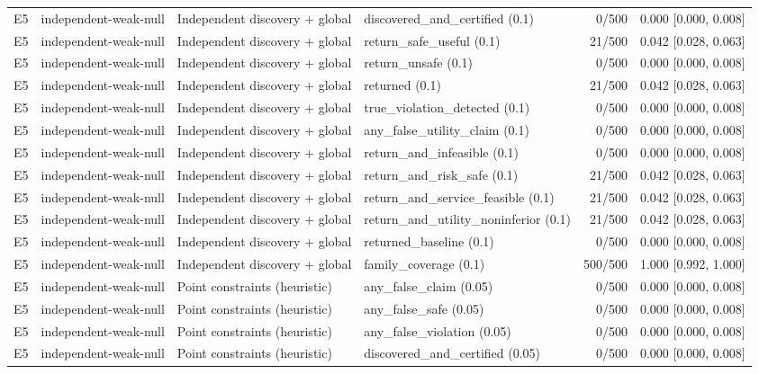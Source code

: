 \begin{longtable}{p{.04\linewidth}p{.18\linewidth}p{.19\linewidth}p{.16\linewidth}r p{.21\linewidth}}
E5 & independent-weak-null & Independent discovery + global & discovered\_and\_certified (0.1) & 0/500 & 0.000 [0.000, 0.008]\\
E5 & independent-weak-null & Independent discovery + global & return\_safe\_useful (0.1) & 21/500 & 0.042 [0.028, 0.063]\\
E5 & independent-weak-null & Independent discovery + global & return\_unsafe (0.1) & 0/500 & 0.000 [0.000, 0.008]\\
E5 & independent-weak-null & Independent discovery + global & returned (0.1) & 21/500 & 0.042 [0.028, 0.063]\\
E5 & independent-weak-null & Independent discovery + global & true\_violation\_detected (0.1) & 0/500 & 0.000 [0.000, 0.008]\\
E5 & independent-weak-null & Independent discovery + global & any\_false\_utility\_claim (0.1) & 0/500 & 0.000 [0.000, 0.008]\\
E5 & independent-weak-null & Independent discovery + global & return\_and\_infeasible (0.1) & 0/500 & 0.000 [0.000, 0.008]\\
E5 & independent-weak-null & Independent discovery + global & return\_and\_risk\_safe (0.1) & 21/500 & 0.042 [0.028, 0.063]\\
E5 & independent-weak-null & Independent discovery + global & return\_and\_service\_feasible (0.1) & 21/500 & 0.042 [0.028, 0.063]\\
E5 & independent-weak-null & Independent discovery + global & return\_and\_utility\_noninferior (0.1) & 21/500 & 0.042 [0.028, 0.063]\\
E5 & independent-weak-null & Independent discovery + global & returned\_baseline (0.1) & 0/500 & 0.000 [0.000, 0.008]\\
E5 & independent-weak-null & Independent discovery + global & family\_coverage (0.1) & 500/500 & 1.000 [0.992, 1.000]\\
E5 & independent-weak-null & Point constraints (heuristic) & any\_false\_claim (0.05) & 0/500 & 0.000 [0.000, 0.008]\\
E5 & independent-weak-null & Point constraints (heuristic) & any\_false\_safe (0.05) & 0/500 & 0.000 [0.000, 0.008]\\
E5 & independent-weak-null & Point constraints (heuristic) & any\_false\_violation (0.05) & 0/500 & 0.000 [0.000, 0.008]\\
E5 & independent-weak-null & Point constraints (heuristic) & discovered\_and\_certified (0.05) & 0/500 & 0.000 [0.000, 0.008]\\

\end{longtable}
